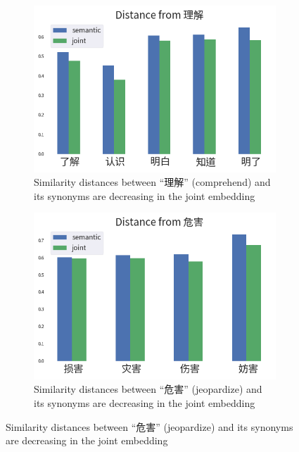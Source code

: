 \vspace{0.4cm}
\begin{figure}[h!]
    \begin{CJK}{UTF8}{gbsn}
    \centering
    \begin{subfigure}[b]{0.49\textwidth}
        \centering
        \includegraphics[width=\textwidth]{../images/similarity_zh1.png}
        \caption{Similarity distances between ``理解'' (comprehend) and its synonyms are decreasing in the joint embedding}
        \label{fig:similarity_zh1}
    \end{subfigure}
    \hfill
    \begin{subfigure}[b]{0.49\textwidth}
        \centering
        \includegraphics[width=\textwidth]{../images/similarity_zh2.png}
        \caption{Similarity distances between ``危害'' (jeopardize) and its synonyms are decreasing in the joint embedding}

\end{subfigure}
\end{CJK}
\end{figure}
